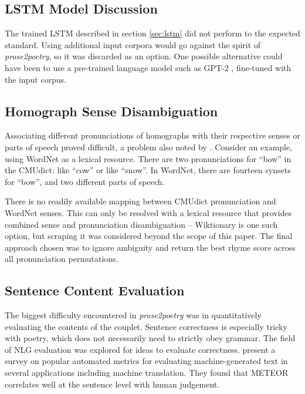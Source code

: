 \documentclass[11pt,a4paper]{article}
\begin{document}
\subsection{LSTM Model Discussion}
\label{sec:discconclstm}

The trained LSTM described in section \ref{sec:lstm} did not perform to the expected standard. Using additional input corpora would go against the spirit of \textit{prose2poetry}, so it was discarded as an option. One possible alternative could have been to use a pre-trained language model such as GPT-2 \cite{gpt2}, fine-tuned with the input corpus.

\subsection{Homograph Sense Disambiguation}
\label{sec:synset}

Associating different pronunciations of homographs with their respective senses or parts of speech proved difficult, a problem also noted by \citet{hopkins-kiela-2017}. Consider an example, using WordNet \cite{wordnet} as a lexical resource. There are two pronunciations for ``bow'' in the CMUdict: like ``cow'' or like ``snow''. In WordNet, there are fourteen synsets for ``bow'', and two different parts of speech.

There is no readily available mapping between CMUdict pronunciation and WordNet senses. This can only be resolved with a lexical resource that provides combined sense and pronunciation disambiguation -- Wiktionary \cite{wiktionary} is one such option, but scraping it was considered beyond the scope of this paper. The final approach chosen was to ignore ambiguity and return the best rhyme score across all pronunciation permutations.

\subsection{Sentence Content Evaluation}
\label{sec:nlg}

The biggest difficulty encountered in \textit{prose2poetry} was in quantitatively evaluating the contents of the couplet. Sentence correctness is especially tricky with poetry, which does not necessarily need to strictly obey grammar. The field of NLG evaluation was explored for ideas to evaluate correctness. \citet{nlgeval} present a survey on popular automated metrics for evaluating machine-generated text in several applications including machine translation. They found that METEOR \cite{meteor} correlates well at the sentence level with human judgement.
\end{document}
